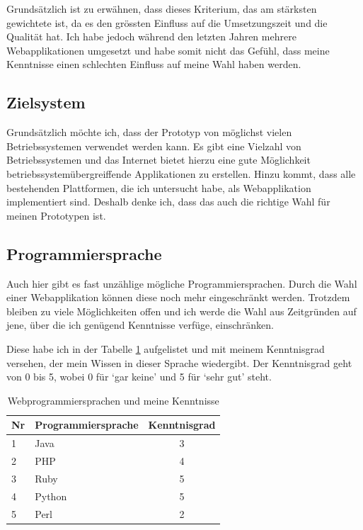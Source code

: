 Grundsätzlich ist zu erwähnen, dass dieses Kriterium, das am stärksten
gewichtete ist, da es den grössten Einfluss auf die Umsetzungszeit und die
Qualität hat. Ich habe jedoch während den letzten Jahren mehrere Webapplikationen
umgesetzt und habe somit nicht das Gefühl, dass meine Kenntnisse einen schlechten Einfluss
auf meine Wahl haben werden. 
 
\subsection{Zielsystem}
Grundsätzlich möchte ich, dass der Prototyp von möglichst vielen Betriebssystemen
verwendet werden kann. Es gibt eine Vielzahl von Betriebssystemen \cite{betriebssysteme}
und das Internet bietet hierzu eine gute Möglichkeit betriebssystemübergreiffende
Applikationen zu erstellen. Hinzu kommt, dass alle bestehenden Plattformen,
die ich untersucht habe, als Webapplikation implementiert sind. Deshalb denke ich, 
dass das auch die richtige Wahl für meinen Prototypen ist.

\subsection{Programmiersprache}
Auch hier gibt es fast unzählige mögliche Programmiersprachen. Durch die Wahl
einer Webapplikation können diese noch mehr eingeschränkt werden. Trotzdem 
bleiben zu viele Möglichkeiten offen \cite{programmiersprachen} und ich werde 
die Wahl aus Zeitgründen auf jene, über die ich genügend Kenntnisse verfüge, 
einschränken.

Diese habe ich in der Tabelle \ref{tab:programmiersprachen} aufgelistet und 
mit meinem Kenntnisgrad versehen, der mein Wissen in dieser Sprache wiedergibt.
Der Kenntnisgrad geht von 0 bis 5, wobei 0 für `gar keine' und 5 für `sehr gut'
steht.

\begin{table}[h]
\begin{center}
    \begin{tabular}{llc}
        \toprule Nr & Programmiersprache & Kenntnisgrad \\
        \midrule 1 & Java & 3 \\
        \midrule 2 & PHP & 4 \\
        \midrule 3 & Ruby & 5 \\
        \midrule 4 & Python & 5 \\
        \midrule 5 & Perl & 2 \\
        \bottomrule
    \end{tabular}
    \caption{Webprogrammiersprachen und meine Kenntnisse}
    \label{tab:programmiersprachen}
\end{center}
\end{table}

